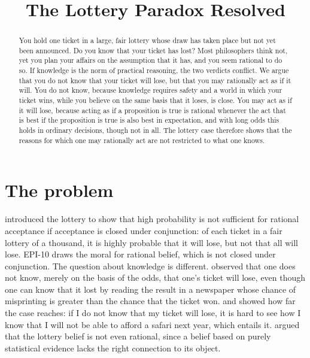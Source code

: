 \documentclass{situationist-preprint}
\title{The Lottery Paradox Resolved}
\begin{document}
\maketitle

\begin{abstract}
You hold one ticket in a large, fair lottery whose draw has taken place but not yet been announced. Do you know that your ticket has lost? Most philosophers think not, yet you plan your affairs on the assumption that it has, and you seem rational to do so. If knowledge is the norm of practical reasoning, the two verdicts conflict. We argue that you do not know that your ticket will lose, but that you may rationally act as if it will. You do not know, because knowledge requires safety and a world in which your ticket wins, while you believe on the same basis that it loses, is close. You may act as if it will lose, because acting as if a proposition is true is rational whenever the act that is best if the proposition is true is also best in expectation, and with long odds this holds in ordinary decisions, though not in all. The lottery case therefore shows that the reasons for which one may rationally act are not restricted to what one knows.
\end{abstract}

\section{The problem}

\citet{Kyburg1961} introduced the lottery to show that high probability is not sufficient for rational acceptance if acceptance is closed under conjunction: of each ticket in a fair lottery of a thousand, it is highly probable that it will lose, but not that all will lose. EPI-10 draws the moral for rational belief, which is not closed under conjunction. The question about knowledge is different. \citet{Harman1973} observed that one does not know, merely on the basis of the odds, that one's ticket will lose, even though one can know that it lost by reading the result in a newspaper whose chance of misprinting is greater than the chance that the ticket won. \citet{Vogel1990} and \citet{Hawthorne2004} showed how far the case reaches: if I do not know that my ticket will lose, it is hard to see how I know that I will not be able to afford a safari next year, which entails it. \citet{Nelkin2000} argued that the lottery belief is not even rational, since a belief based on purely statistical evidence lacks the right connection to its object.
\end{document}
